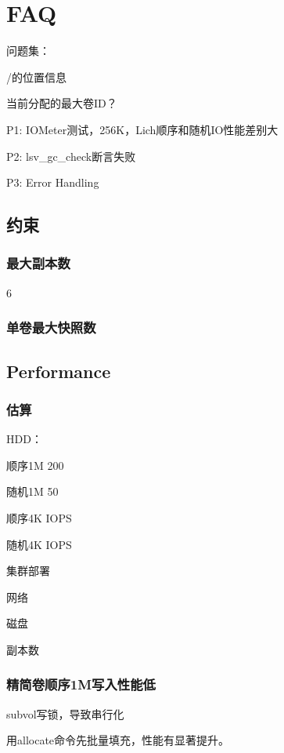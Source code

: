 \chapter{FAQ}

问题集：
\begin{enumbox}
\item /的位置信息
\item 当前分配的最大卷ID？
\end{enumbox}

P1: IOMeter测试，256K，Lich顺序和随机IO性能差别大

P2: lsv\_gc\_check断言失败

P3: Error Handling

\section{约束}

\subsection{最大副本数}

6

\subsection{单卷最大快照数}


\section{Performance}

\subsection{估算}

HDD：
\begin{itembox}
\item 顺序1M 200
\item 随机1M 50
\item 顺序4K IOPS
\item 随机4K IOPS
\end{itembox}

集群部署
\begin{enumbox}
\item 网络
\item 磁盘
\item 副本数
\end{enumbox}

\subsection{精简卷顺序1M写入性能低}

subvol写锁，导致串行化

用allocate命令先批量填充，性能有显著提升。
